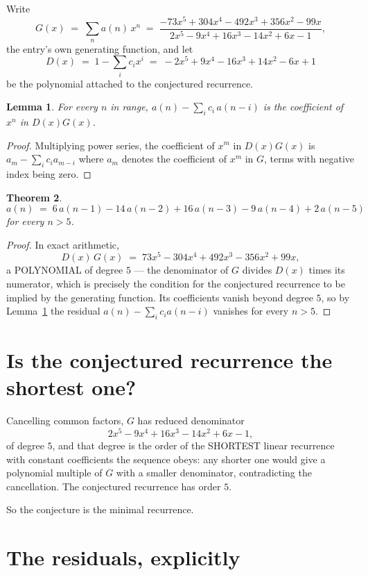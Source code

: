 \documentclass[11pt,a4paper]{article}
\theoremstyle{plain}
\newtheorem{theorem}{Theorem}
\newtheorem{lemma}[theorem]{Lemma}
\theoremstyle{definition}
\begin{document}
Write
\[
G(x)\;=\;\sum_{n}a(n)\,x^{n}\;=\;\frac{- 73 x^{5} + 304 x^{4} - 492 x^{3} + 356 x^{2} - 99 x}{2 x^{5} - 9 x^{4} + 16 x^{3} - 14 x^{2} + 6 x - 1},
\]
the entry's own generating function, and let
\[
D(x)\;=\;1-\sum_i c_i x^{i}\;=\;- 2 x^{5} + 9 x^{4} - 16 x^{3} + 14 x^{2} - 6 x + 1
\]
be the polynomial attached to the conjectured recurrence.

\begin{lemma}\label{lem:key}
For every $n$ in range, $a(n)-\sum_i c_i\,a(n-i)$ is the coefficient of $x^{n}$ in
$D(x)G(x)$.
\end{lemma}

\begin{proof}
Multiplying power series, the coefficient of $x^{m}$ in $D(x)G(x)$ is
$a_m-\sum_i c_i a_{m-i}$ where $a_m$ denotes the coefficient of $x^{m}$ in $G$, terms with
negative index being zero.
\end{proof}

\begin{theorem}
\[
a(n)\;=\;6\,a(n-1) - 14\,a(n-2) + 16\,a(n-3) - 9\,a(n-4) + 2\,a(n-5)
\]
for every $n>5$.
\end{theorem}

\begin{proof}
In exact arithmetic,
\[
D(x)\,G(x)\;=\;73 x^{5} - 304 x^{4} + 492 x^{3} - 356 x^{2} + 99 x,
\]
a POLYNOMIAL of degree $5$ --- the denominator of $G$ divides $D(x)$ times its numerator,
which is precisely the condition for the conjectured recurrence to be implied by the
generating function. Its coefficients vanish beyond degree $5$, so by
Lemma~\ref{lem:key} the residual $a(n)-\sum_ic_ia(n-i)$ vanishes for every
$n>5$.
\end{proof}

\section{Is the conjectured recurrence the shortest one?}

Cancelling common factors, $G$ has reduced denominator
\[
2 x^{5} - 9 x^{4} + 16 x^{3} - 14 x^{2} + 6 x - 1,
\]
of degree $5$, and that degree is the order of the SHORTEST linear recurrence with
constant coefficients the sequence obeys: any shorter one would give a polynomial multiple of
$G$ with a smaller denominator, contradicting the cancellation. The conjectured recurrence has
order $5$.

So the conjecture is the minimal recurrence.

\section{The residuals, explicitly}
\end{document}
